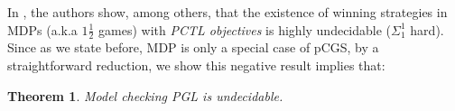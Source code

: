 \documentclass[times, 10 pt,twocolumn]{article}
\newtheorem{theorem}{Theorem}{\bfseries}{\rm}
\newtheorem{remark}{Remark}{\itshape}{\rm}
\newcommand{\mb}[1]{\mathbb{#1}}
\newcommand{\mc}[1]{\mathcal{#1}}
\newcommand{\lla}{\langle\langle}
\newcommand{\rra}{\rangle\rangle}
\begin{document}
%
%
%
%


In \cite{BBFK06}, the authors show, among others, that the
existence of winning strategies in MDPs (a.k.a $1\frac{1}{2}$
games) with \emph{PCTL objectives} is highly undecidable
($\Sigma_1^1$ hard). Since as we state before, MDP is only a
special case of pCGS, by a straightforward reduction, we show this
negative result implies that:

\begin{theorem} \label{un}
  Model checking PGL is undecidable.
\end{theorem}
\end{document}
